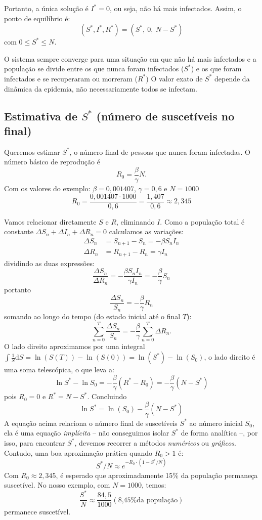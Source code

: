 \documentclass{article}
\begin{document}
Portanto, a única solução é $I^* = 0$, ou seja, não há mais infectados.
Assim, o ponto de equilíbrio é:
\[
\boxed{ (S^*, I^*, R^*) = (S^*,\ 0,\ N - S^*) }
\]
com $0 \leq S^* \leq N$.

O sistema sempre converge para uma situação em que não há mais
infectados e a população se divide entre os que nunca foram infectados
($S^*$) e os que foram infectados e se recuperaram ou morreram ($R^*$)
O valor exato de $S^*$ depende da dinâmica da epidemia, não
necessariamente todos se infectam.

\subsection*{Estimativa de $S^*$ (número de suscetíveis no final)}

Queremos estimar $S^*$, o número final de pessoas que nunca foram
infectadas. O número básico de reprodução é
\[
R_0 = \frac{\beta }{\gamma} N.
\]
Com os valores do exemplo: \(\beta = 0{,}001407\), \(\gamma = 0{,}6\) e \(N = 1000\)
\[
R_0 = \frac{0{,}001407 \cdot 1000}{0,6} = \frac{1{,}407}{0{,}6} \approx 2{,}345
\]

Vamos relacionar diretamente \( S \) e \( R \), eliminando \( I
\). Como a população total é constante
\( \Delta S_n + \Delta I_n + \Delta R_n = 0 \) calculamos as variações:
\[
  \begin{aligned}
    \Delta S_n &= S_{n+1} - S_n = -\beta S_n I_n\\
    \Delta R_n &= R_{n+1} - R_n = \gamma I_n
\end{aligned}
\]
dividindo as duas expressões:
\[
  \frac{\Delta S_n}{\Delta R_n} = -\frac{\beta S_n I_n}{\gamma I_n} =
  -\frac{\beta}{\gamma} S_n
\]
portanto
\[
  \frac{\Delta S_n}{S_n} = 
  -\frac{\beta}{\gamma}  R_n
\]
somando ao longo do tempo (do estado inicial até o final $T$):
\[
  \sum_{n=0}^{T} \frac{\Delta S_n}{S_n} = -\frac{\beta}{\gamma} \sum_{n=0}^{T}
  \Delta R_n.
\]
O lado direito aproximamos por uma integral
$\int \tfrac 1S \mathrm{d}S = \ln(S(T)) -\ln(S(0)) =
\ln(S^*)-\ln(S_0)$, o lado direito é uma soma telescópica, o que leva
a:
\[
\ln S^* - \ln S_0 = -\frac{\beta}{\gamma}  (R^* - R_0) = -\frac{\beta}{\gamma} (N - S^*)
\]
pois \( R_0 = 0 \) e \( R^* = N - S^* \). Concluindo
\[
\boxed{  
\ln {S^*} =\ln(S_0) -\frac{\beta}{\gamma}  (N - S^*)  
}
\]
A equação acima relaciona o número final de suscetíveis \( S^* \) ao
número inicial \( S_0 \), ela é uma equação \emph{implícita} -- não
conseguimos isolar \( S^* \) de forma analítica --, por isso, para
encontrar \( S^* \), devemos recorrer a métodos \emph{numéricos} ou
\emph{gráficos}.  Contudo, uma boa aproximação prática quando $R_0 > 1$
é:
\[
  S^*/N \approx e^{-R_0 \cdot (1 - S^*/N)}
\]
Com $R_0 \approx 2,345$, é esperado que aproximadamente 15\%  da
população permaneça suscetível. No nosso exemplo, com $N = 1000$, temos:
\[
\frac{S^*}N \approx \frac{84,5}{1000} (\text{8,45\% da população})
\]
permanece suscetível.
\end{document}
